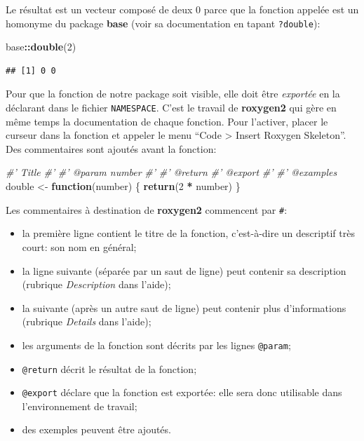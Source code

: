 \documentclass[
  12pt,
  french,
  a4paper,
  extrafontsizes,onecolumn,openright
  ]{memoir}
\newenvironment{Shaded}{\begin{snugshade}}{\end{snugshade}}
\newcommand{\CommentTok}[1]{\textcolor[rgb]{0.56,0.35,0.01}{\textit{#1}}}
\newcommand{\ControlFlowTok}[1]{\textcolor[rgb]{0.13,0.29,0.53}{\textbf{#1}}}
\newcommand{\DecValTok}[1]{\textcolor[rgb]{0.00,0.00,0.81}{#1}}
\newcommand{\KeywordTok}[1]{\textcolor[rgb]{0.13,0.29,0.53}{\textbf{#1}}}
\newcommand{\NormalTok}[1]{#1}
\newcommand{\OperatorTok}[1]{\textcolor[rgb]{0.81,0.36,0.00}{\textbf{#1}}}
\newcommand{\StringTok}[1]{\textcolor[rgb]{0.31,0.60,0.02}{#1}}
\providecommand{\tightlist}{%
  \setlength{\itemsep}{0pt}\setlength{\parskip}{0pt}}
\begin{document}
\normalsize

Le résultat est un vecteur composé de deux 0 parce que la fonction appelée est un homonyme du package \textbf{base} (voir sa documentation en tapant \texttt{?double}):

\scriptsize

\begin{Shaded}
\begin{Highlighting}[]
\NormalTok{base}\OperatorTok{::}\KeywordTok{double}\NormalTok{(}\DecValTok{2}\NormalTok{)}
\end{Highlighting}
\end{Shaded}

\begin{verbatim}
## [1] 0 0
\end{verbatim}

\normalsize

Pour que la fonction de notre package soit visible, elle doit être \emph{exportée} en la déclarant dans le fichier \texttt{NAMESPACE}.
C'est le travail de \textbf{roxygen2} qui gère en même temps la documentation de chaque fonction.
Pour l'activer, placer le curseur dans la fonction et appeler le menu \enquote{Code \textgreater{} Insert Roxygen Skeleton}.
Des commentaires sont ajoutés avant la fonction:

\scriptsize

\begin{Shaded}
\begin{Highlighting}[]
\CommentTok{#' Title}
\CommentTok{#'}
\CommentTok{#' @param number }
\CommentTok{#'}
\CommentTok{#' @return}
\CommentTok{#' @export}
\CommentTok{#'}
\CommentTok{#' @examples}
\NormalTok{double <-}\StringTok{ }\ControlFlowTok{function}\NormalTok{(number) \{}
    \KeywordTok{return}\NormalTok{(}\DecValTok{2} \OperatorTok{*}\StringTok{ }\NormalTok{number)}
\NormalTok{\}}
\end{Highlighting}
\end{Shaded}

\normalsize

Les commentaires à destination de \textbf{roxygen2} commencent par \texttt{\#\textquotesingle{}}:

\begin{itemize}
\tightlist
\item
  la première ligne contient le titre de la fonction, c'est-à-dire un descriptif très court: son nom en général;
\item
  la ligne suivante (séparée par un saut de ligne) peut contenir sa description (rubrique \emph{Description} dans l'aide);
\item
  la suivante (après un autre saut de ligne) peut contenir plus d'informations (rubrique \emph{Details} dans l'aide);
\item
  les arguments de la fonction sont décrits par les lignes \texttt{@param};
\item
  \texttt{@return} décrit le résultat de la fonction;
\item
  \texttt{@export} déclare que la fonction est exportée: elle sera donc utilisable dans l'environnement de travail;
\item
  des exemples peuvent être ajoutés.
\end{itemize}
\end{document}
